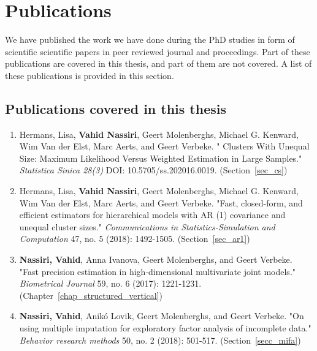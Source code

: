 \documentclass[11pt,a5paper,twoside]{book}
\begin{document}
\section{Publications}

We have published the work we have done during the PhD studies in form of scientific scientific papers in peer reviewed journal and proceedings. Part of these publications are covered in this thesis, and part of them are not covered. A list of these publications is provided in this section.

\subsection{Publications covered in this thesis}

\begin{enumerate}


	\item \textcolor[HTML]{222222}{Hermans, Lisa, \textbf{Vahid Nassiri}, Geert Molenberghs, Michael G. Kenward, Wim Van der Elst, Marc Aerts, and Geert Verbeke. "} \textcolor[HTML]{222222}{Clusters With Unequal Size: Maximum Likelihood Versus Weighted Estimation in Large Samples." \textit{Statistica Sinica 28(3) }DOI: 10.5705/ss.202016.0019.} (Section~\ref{sec_cs})

	\item \textcolor[HTML]{222222}{Hermans, Lisa, \textbf{Vahid Nassiri}, Geert Molenberghs, Michael G. Kenward, Wim Van der Elst, Marc Aerts, and Geert Verbeke. "Fast, closed-form, and efficient estimators for hierarchical models with AR (1) covariance and unequal cluster sizes." \textit{Communications in Statistics-Simulation and Computation} 47, no. 5 (2018): 1492-1505.} (Section~\ref{sec_ar1})

	
	\item \textbf{\textcolor[HTML]{222222}{Nassiri, Vahid}}\textcolor[HTML]{222222}{, Anna Ivanova, Geert Molenberghs, and Geert Verbeke. "Fast precision estimation in high‐dimensional multivariate joint models." \textit{Biometrical Journal} 59, no. 6 (2017): 1221-1231.} (Chapter~\ref{chap_structured_vertical})
	
	
	
	\item \textbf{\textcolor[HTML]{222222}{Nassiri, Vahid}}\textcolor[HTML]{222222}{, Anikó Lovik, Geert Molenberghs, and Geert Verbeke. "On using multiple imputation for exploratory factor analysis of incomplete data." \textit{Behavior research methods} 50, no. 2 (2018): 501-517.} (Section~\ref{secc_mifa})


\end{enumerate}
\end{document}
